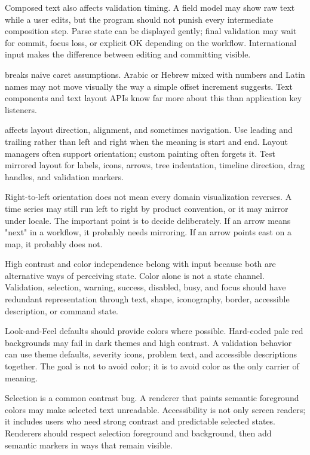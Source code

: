 Composed text also affects validation timing. A field model may show raw text while a user edits, but the program should not punish every intermediate composition step. Parse state can be displayed gently; final validation may wait for commit, focus loss, or explicit OK depending on the workflow. International input makes the difference between editing and committing visible.

 breaks naive caret assumptions. Arabic or Hebrew mixed with numbers and Latin names may not move visually the way a simple offset increment suggests. Text components and text layout APIs know far more about this than application key listeners.

 affects layout direction, alignment, and sometimes navigation. Use leading and trailing rather than left and right when the meaning is start and end. Layout managers often support orientation; custom painting often forgets it. Test mirrored layout for labels, icons, arrows, tree indentation, timeline direction, drag handles, and validation markers.

Right-to-left orientation does not mean every domain visualization reverses. A time series may still run left to right by product convention, or it may mirror under locale. The important point is to decide deliberately. If an arrow means "next" in a workflow, it probably needs mirroring. If an arrow points east on a map, it probably does not.

High contrast and color independence belong with input because both are alternative ways of perceiving state. Color alone is not a state channel. Validation, selection, warning, success, disabled, busy, and focus should have redundant representation through text, shape, iconography, border, accessible description, or command state.

Look-and-Feel defaults should provide colors where possible. Hard-coded pale red backgrounds may fail in dark themes and high contrast. A validation behavior can use theme defaults, severity icons, problem text, and accessible descriptions together. The goal is not to avoid color; it is to avoid color as the only carrier of meaning.

Selection is a common contrast bug. A renderer that paints semantic foreground colors may make selected text unreadable. Accessibility is not only screen readers; it includes users who need strong contrast and predictable selected states. Renderers should respect selection foreground and background, then add semantic markers in ways that remain visible.

